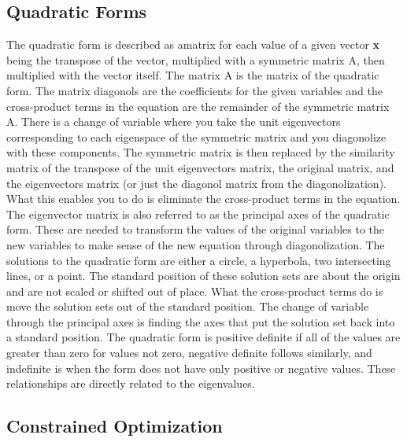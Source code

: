 \documentclass[12pt]{article}
\begin{document}
\subsection{Quadratic Forms}
The quadratic form is described as amatrix for each value of a given vector \textbf{x} being the transpose of the vector, multiplied with a symmetric matrix A, then multiplied with 
the vector itself. The matrix A is the matrix of the quadratic form. The matrix diagonols are the coefficients for the given variables and the cross-product terms in the equation are 
the remainder of the symmetric matrix A. There is a change of variable where you take the unit eigenvectors corresponding to each eigenspace of the symmetric matrix and you diagonolize 
with these components. The symmetric matrix is then replaced by the similarity matrix of the transpose of the unit eigenvectors matrix, the original matrix, and the eigenvectors matrix 
(or just the diagonol matrix from the diagonolization). What this enables you to do is eliminate the cross-product terms in the equation. The eigenvector matrix is also referred to as 
the principal axes of the quadratic form. These are needed to transform the values of the original variables to the new variables to make sense of the new equation through diagonolization. 
\newline
\newline
The solutions to the quadratic form are either a circle, a hyperbola, two intersecting lines, or a point. The standard position of these solution sets are about the origin and are not 
scaled or shifted out of place. What the cross-product terms do is move the solution sets out of the standard position. The change of variable through the principal axes is finding the 
axes that put the solution set back into a standard position. The quadratic form is positive definite if all of the values are greater than zero for values not zero, negative definite 
follows similarly, and indefinite is when the form does not have only positive or negative values. These relationships are directly related to the eigenvalues. 
\subsection{Constrained Optimization} 
\end{document}
